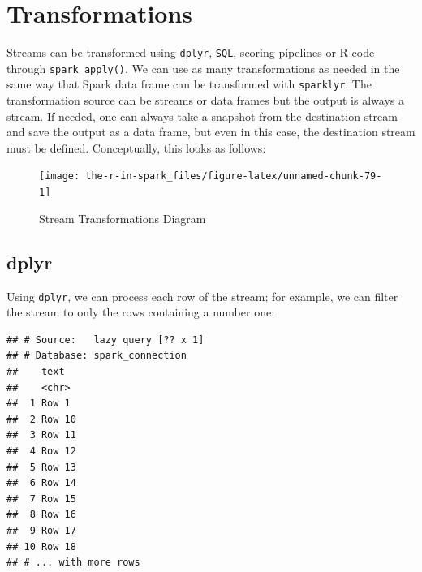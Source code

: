 \documentclass[]{book}
\newenvironment{Shaded}{\begin{snugshade}}{\end{snugshade}}
\newcommand{\DataTypeTok}[1]{\textcolor[rgb]{0.13,0.29,0.53}{#1}}
\newcommand{\KeywordTok}[1]{\textcolor[rgb]{0.13,0.29,0.53}{\textbf{#1}}}
\newcommand{\NormalTok}[1]{#1}
\newcommand{\OperatorTok}[1]{\textcolor[rgb]{0.81,0.36,0.00}{\textbf{#1}}}
\newcommand{\OtherTok}[1]{\textcolor[rgb]{0.56,0.35,0.01}{#1}}
\newcommand{\StringTok}[1]{\textcolor[rgb]{0.31,0.60,0.02}{#1}}
\theoremstyle{definition}
\theoremstyle{definition}
\theoremstyle{definition}
\theoremstyle{remark}
\begin{document}
\hypertarget{transformations}{%
\section{Transformations}\label{transformations}}

Streams can be transformed using \texttt{dplyr}, \texttt{SQL}, scoring
pipelines or R code through \texttt{spark\_apply()}. We can use as many
transformations as needed in the same way that Spark data frame can be
transformed with \texttt{sparklyr}. The transformation source can be
streams or data frames but the output is always a stream. If needed, one
can always take a snapshot from the destination stream and save the
output as a data frame, but even in this case, the destination stream
must be defined. Conceptually, this looks as follows:

\begin{figure}

{\centering \texttt{[image: the-r-in-spark\_files/figure-latex/unnamed-chunk-79-1]} 

}

\caption{Stream Transformations Diagram}\label{fig:unnamed-chunk-79}
\end{figure}

\hypertarget{streams-dplyr}{%
\subsection{dplyr}\label{streams-dplyr}}

Using \texttt{dplyr}, we can process each row of the stream; for
example, we can filter the stream to only the rows containing a number
one:

\begin{Shaded}
\end{Shaded}

\begin{verbatim}
## # Source:   lazy query [?? x 1]
## # Database: spark_connection
##    text  
##    <chr> 
##  1 Row 1 
##  2 Row 10
##  3 Row 11
##  4 Row 12
##  5 Row 13
##  6 Row 14
##  7 Row 15
##  8 Row 16
##  9 Row 17
## 10 Row 18
## # ... with more rows
\end{verbatim}
\end{document}
